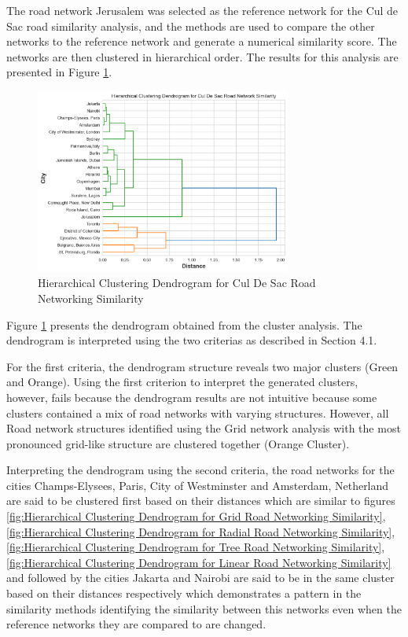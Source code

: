 The road network Jerusalem was selected as the reference network for the Cul de Sac road similarity analysis, and the methods are used to compare the other networks to the reference network and generate a numerical similarity score. The networks are then clustered in hierarchical order. The results for this analysis are presented in Figure \ref{fig:Hierarchical Clustering Dendrogram for Cul De Sac Road Networking Similarity}.

\begin{figure}[!ht]
\centering
\includegraphics[width=0.75\textwidth,center]{picture/Cul De Sac/culdesac_dendrogram2.png}
\caption[Hierarchical Clustering Dendrogram for Cul De Sac Road Networking Similarity]{Hierarchical Clustering Dendrogram for Cul De Sac Road Networking Similarity}
\label{fig:Hierarchical Clustering Dendrogram for Cul De Sac Road Networking Similarity}
\end{figure}

Figure \ref{fig:Hierarchical Clustering Dendrogram for Cul De Sac Road Networking Similarity} presents the dendrogram obtained from the cluster analysis. The dendrogram is interpreted using the two criterias as described in Section 4.1.

For the first criteria, the dendrogram structure reveals two major clusters (Green and Orange). Using the first criterion to interpret the generated clusters, however, fails because the dendrogram results are not intuitive because some clusters contained a mix of road networks with varying structures. However, all Road network structures identified using the Grid network analysis with the most pronounced grid-like structure are clustered together (Orange Cluster).

Interpreting the dendrogram using the second criteria, the road networks for the cities Champs-Elysees, Paris, City of Westminster and Amsterdam, Netherland are said to be clustered first based on their distances which are similar to figures \ref{fig:Hierarchical Clustering Dendrogram for Grid Road Networking Similarity}, \ref{fig:Hierarchical Clustering Dendrogram for Radial Road Networking Similarity}, \ref{fig:Hierarchical Clustering Dendrogram for Tree Road Networking Similarity}, \ref{fig:Hierarchical Clustering Dendrogram for Linear Road Networking Similarity} and  followed by the cities Jakarta and Nairobi are said to be in the same cluster based on their distances  respectively which demonstrates a pattern in the similarity methods identifying the similarity between this networks even when the reference networks they are compared to are changed.

